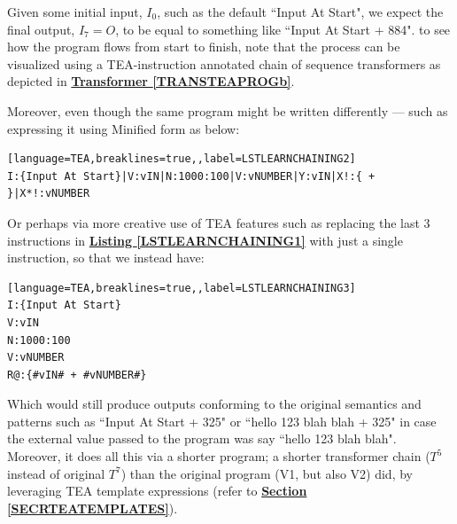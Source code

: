 \documentclass[a4paper, 18pt]{book} %
\begin{document}
{{{\begin{appendices}
Given some initial input, $I_0$, such as the default ``Input At Start", we expect the final output, $I_7 = O$, to be equal to something like ``Input At Start + 884". to see how the program flows from start to finish, note that the process can be visualized using a TEA-instruction annotated chain of sequence transformers as depicted in \textbf{\hyperref[TRANSTEAPROGb]{Transformer \ref{TRANSTEAPROGb}}}.

\vspace{2em}

Moreover, even though the same program might be written differently --- such as expressing it using Minified form as below:


\vspace{2em}

  \begin{tcolorbox}[teaterminalstyle, title=LEARN PROGRAMMING: Program Flow in TEA via Sequence-Transformer Chaining Demo V2 (Minified), breakable]
  \begin{lstlisting}[language=TEA,breaklines=true,,label=LSTLEARNCHAINING2]
I:{Input At Start}|V:vIN|N:1000:100|V:vNUMBER|Y:vIN|X!:{ + }|X*!:vNUMBER
   \end{lstlisting}
  \end{tcolorbox}
\vspace{2em}

Or perhaps via more creative use of TEA features such as replacing the last 3 instructions in \textbf{\hyperref[LSTLEARNCHAINING1]{Listing \ref{LSTLEARNCHAINING1}}} with just a single instruction, so that we instead have:

\vspace{2em}

  \begin{tcolorbox}[teaterminalstyle, title=LEARN PROGRAMMING: Program Flow in TEA via Sequence-Transformer Chaining Demo V3, breakable]
  \begin{lstlisting}[language=TEA,breaklines=true,,label=LSTLEARNCHAINING3]
I:{Input At Start}
V:vIN
N:1000:100 
V:vNUMBER
R@:{#vIN# + #vNUMBER#}
   \end{lstlisting}
  \end{tcolorbox}
\vspace{2em}

Which would still produce outputs conforming to the original semantics and patterns such as ``Input At Start + 325" or ``hello 123 blah blah + 325" in case the external value passed to the program was say ``hello 123 blah blah". Moreover, it does all this via a shorter program; a shorter transformer chain ($T^5$ instead of original $T^7$) than the original program (V1, but also V2) did, by leveraging TEA template expressions (refer to  \textbf{\hyperref[SECRTEATEMPLATES]{Section \ref{SECRTEATEMPLATES}}}).




\end{appendices}}}}
\end{document}
